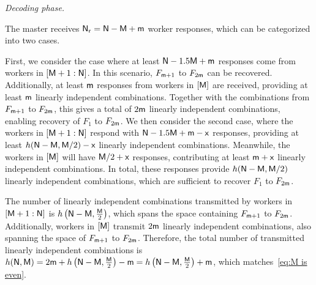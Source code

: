 \documentclass[conference,letterpaper]{IEEEtran}
\begin{document}
{\it Decoding phase.}

The master receives ${\sf N}_{\rm r} = {\sf N} - {\sf M} + {\sf m}$ worker responses, which can be categorized into two cases.

First, we consider the case where at least ${\sf N} - 1.5{\sf M} + {\sf m}$ responses come from workers in $[{\sf M}+1 : {\sf N}]$. In this scenario, $F_{{\sf m}+1}$ to $F_{2{\sf m}}$ can be recovered. Additionally, at least ${\sf m}$ responses from workers in $[{\sf M}]$ are received, providing at least ${\sf m}$ linearly independent combinations. Together with the combinations from $F_{{\sf m}+1}$ to $F_{2{\sf m}}$, this gives a total of $2{\sf m}$ linearly independent combinations, enabling recovery of $F_1$ to $F_{2{\sf m}}$.
We then consider the second case, where the workers in $[{\sf M}+1: {\sf N}]$ respond with ${\sf N} - 1.5{\sf M} + {\sf m} - {\sf x}$ responses, providing at least $h({\sf N} - {\sf M}, {\sf M}/2) - {\sf x}$ linearly independent combinations. Meanwhile, the workers in $[{\sf M}]$ will have ${\sf M}/2 + {\sf x}$ responses, contributing at least ${\sf m} +{\sf x}$ linearly independent combinations. In total, these responses provide $h({\sf N} - {\sf M}, {\sf M}/2)$ linearly independent combinations, which are sufficient to recover $F_1$ to $F_{2{\sf m}}$.

The number of linearly independent combinations transmitted by workers in $[{\sf M}+1:{\sf N}]$ is $h\left({\sf N}-{\sf M}, \frac{{\sf M}}{2}\right)$, which spans the space containing $F_{{\sf m}+1}$ to $F_{2{\sf m}}$. Additionally, workers in $[{\sf M}]$ transmit $2{\sf m}$ linearly independent combinations, also spanning the space of $F_{{\sf m}+1}$ to $F_{2{\sf m}}$. Therefore, the total number of transmitted linearly independent combinations is $h({\sf N},{\sf M})= 2{\sf m} + h\left({\sf N}-{\sf M}, \frac{{\sf M}}{2}\right) - {\sf m} = h\left({\sf N}-{\sf M}, \frac{{\sf M}}{2}\right) + {\sf m}$, which matches~\eqref{eq:M is even}.
\end{document}
